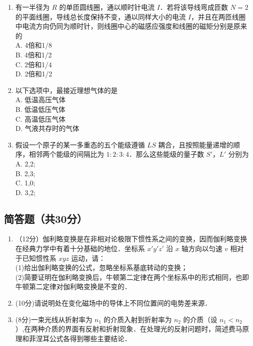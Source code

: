 \begin{enumerate}
\item 有一半径为 $R$ 的单匝圆线圈，通以顺时针电流 $I$．若将该导线弯成匝数 $N=2$ 的平面线圈，导线总长度保持不变，通以同样大小的电流 $I$，并且在两匝线圈中电流方向仍同为顺时针，则线圈中心的磁感应强度和线圈的磁矩分别是原来的\\
A. 4倍和1/8\\
B. 4倍和1/2\\
C. 2倍和1/4\\
D. 2倍和1/2\\

\item 以下选项中，最接近理想气体的是\\
A. 低温高压气体\\
B. 低温低压气体\\
C. 高温低压气体\\
D. 气液共存时的气体\\

\item 假设一个原子的某一多重态的五个能级遵循 $LS$ 耦合，且按照能量递增的顺序，相邻两个能级的间隔比为 $1:2:3:4$．那么这些能级的量子数 $S'$，$L'$ 分别为\\
A. 2,2;\\
B. 2,3;\\
C. 1,0;\\
D. 3,2;\\
\end{enumerate}
\subsection{简答题（共30分）}
\begin{enumerate}
\item （12分）伽利略变换是在非相对论极限下惯性系之间的变换，因而伽利略变换在经典力学中有着十分基础的地位．坐标系 $x'y'z'$ 沿 $x$ 轴方向以匀速 $v$ 相对于已知惯性系 $xyz$ 运动，请：\\
(1)给出伽利略变换的公式，忽略坐标系基底转动的变换；\\
(2)简要证明在伽利略变换后，牛顿第二定律在两个坐标系中的形式相同，也即牛顿第二定律对伽利略变换是不变的．\\

\item (10分)请说明处在变化磁场中的导体上不同位置间的电势差来源．

\item (8分)一束光线从折射率为 $n_{1}$ 的介质入射到折射率为 $n_{2}$ 的介质（设 $n_{1}<n_{2}$）,在两种介质的界面有反射和折射现象．在处理光的反射问题时，简述费马原理和菲涅耳公式各得到哪些主要结论．
\end{enumerate}
